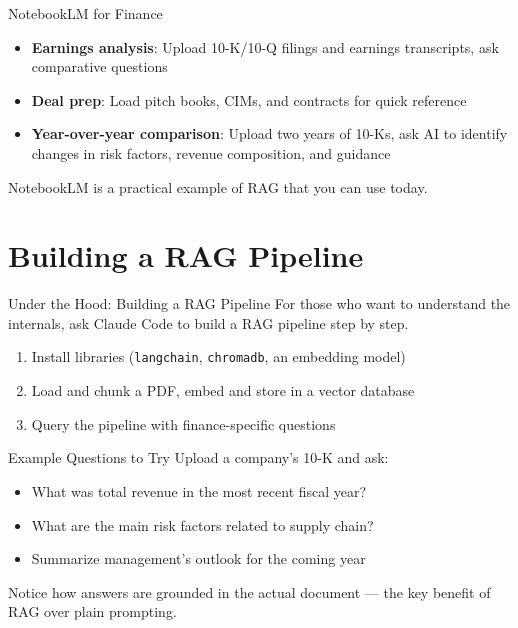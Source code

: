 \documentclass[aspectratio=169]{beamer}
\begin{document}
\begin{frame}{NotebookLM for Finance}
\begin{itemize}
  \item \textbf{Earnings analysis}: Upload 10-K/10-Q filings and earnings transcripts, ask comparative questions
  \item \textbf{Deal prep}: Load pitch books, CIMs, and contracts for quick reference
  \item \textbf{Year-over-year comparison}: Upload two years of 10-Ks, ask AI to identify changes in risk factors, revenue composition, and guidance
\end{itemize}
\vspace{0.3cm}
NotebookLM is a practical example of RAG that you can use \alert{today}.
\end{frame}

\section{Building a RAG Pipeline}

\begin{frame}{Under the Hood: Building a RAG Pipeline}
For those who want to understand the internals, ask Claude Code to build a RAG pipeline step by step.
\vspace{0.3cm}
\begin{enumerate}
  \item Install libraries (\texttt{langchain}, \texttt{chromadb}, an embedding model)
  \item Load and chunk a PDF, embed and store in a vector database
  \item Query the pipeline with finance-specific questions
\end{enumerate}
\end{frame}

\begin{frame}{Example Questions to Try}
Upload a company's 10-K and ask:
\vspace{0.3cm}
\begin{itemize}
  \item What was total revenue in the most recent fiscal year?
  \item What are the main risk factors related to supply chain?
  \item Summarize management's outlook for the coming year
\end{itemize}
\vspace{0.3cm}
Notice how answers are grounded in the actual document --- the key benefit of RAG over plain prompting.
\end{frame}
\end{document}
